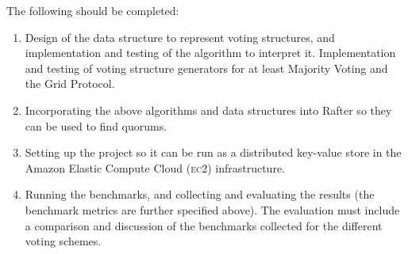 \documentclass[12pt,chapterprefix=true,toc=bibliography,numbers=noendperiod,
               footnotes=multiple,twoside]{scrreprt}
\begin{document}
The following should be completed:

\begin{enumerate}

\item Design of the data structure to represent voting structures, and implementation and testing of the algorithm to interpret it. Implementation and testing of voting structure generators for at least Majority Voting and the Grid Protocol.

\item Incorporating the above algorithms and data structures into Rafter so they can be used to find quorums.

\item Setting up the project so it can be run as a distributed key-value store in the Amazon Elastic Compute Cloud (\textsc{ec2}) infrastructure.

\item Running the benchmarks, and collecting and evaluating the results (the benchmark metrics are further specified above). The evaluation must include a comparison and discussion of the benchmarks collected for the different voting schemes.


\end{enumerate}
\end{document}

